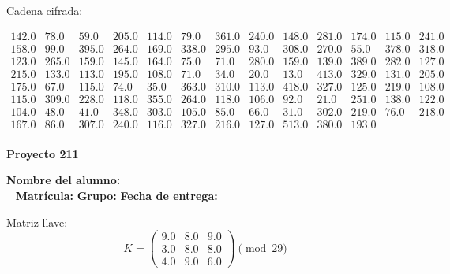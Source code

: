 \documentclass[12pt]{article}
\begin{document}
Cadena cifrada:
\begin{center}
$\begin{array}{lllllllllllll}
142.0 & 78.0 & 59.0 & 205.0 & 114.0 & 79.0 & 361.0 & 240.0 & 148.0 & 281.0 & 174.0 & 115.0 & 241.0\\
158.0 & 99.0 & 395.0 & 264.0 & 169.0 & 338.0 & 295.0 & 93.0 & 308.0 & 270.0 & 55.0 & 378.0 & 318.0\\
123.0 & 265.0 & 159.0 & 145.0 & 164.0 & 75.0 & 71.0 & 280.0 & 159.0 & 139.0 & 389.0 & 282.0 & 127.0\\
215.0 & 133.0 & 113.0 & 195.0 & 108.0 & 71.0 & 34.0 & 20.0 & 13.0 & 413.0 & 329.0 & 131.0 & 205.0\\
175.0 & 67.0 & 115.0 & 74.0 & 35.0 & 363.0 & 310.0 & 113.0 & 418.0 & 327.0 & 125.0 & 219.0 & 108.0\\
115.0 & 309.0 & 228.0 & 118.0 & 355.0 & 264.0 & 118.0 & 106.0 & 92.0 & 21.0 & 251.0 & 138.0 & 122.0\\
104.0 & 48.0 & 41.0 & 348.0 & 303.0 & 105.0 & 85.0 & 66.0 & 31.0 & 302.0 & 219.0 & 76.0 & 218.0\\
167.0 & 86.0 & 307.0 & 240.0 & 116.0 & 327.0 & 216.0 & 127.0 & 513.0 & 380.0 & 193.0\\
\end{array}$
\end{center}

\newpage


\textbf{Proyecto 211}

\textbf{Nombre del alumno:} \underline{\hspace{13cm}}\\\
\vspace{1cm}
\textbf{Matrícula:} \underline{\hspace{4cm}} \hspace{1cm}
\textbf{Grupo:} \underline{\hspace{2cm}}
\textbf{Fecha de entrega:} \underline{\hspace{2cm}}

\medskip

Matriz llave:
\[
K = \begin{pmatrix}
9.0 & 8.0 & 9.0\\
3.0 & 8.0 & 8.0\\
4.0 & 9.0 & 6.0
\end{pmatrix} \pmod{29}
\]
\end{document}

